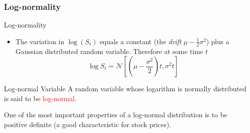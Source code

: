 \documentclass{beamer}
\begin{document}
\subsubsection{Log-normality}
\begin{frame}{Log-normality}
\begin{itemize}
	\item The variation in $\log(S_t)$ equals a constant (the \emph{drift} $\mu-\frac{1}{2}\sigma^2$) plus a Gaussian distributed random variable. Therefore at some time $t$
	\begin{equation*}
		\log S_t = \mathcal{N}\left[\left(\mu -\frac{\sigma^2}{2}\right)t, \sigma^2 t\right]
	\end{equation*}
\end{itemize}
\begin{block}{Log-normal Variable}
A random variable whose logarithm is normally distributed is said to be \textcolor{red}{log-normal}.

One of the most important properties of a log-normal distribution is to be positive definite (a good characteristic for stock prices).
\end{block}
\end{frame}
\end{document}
